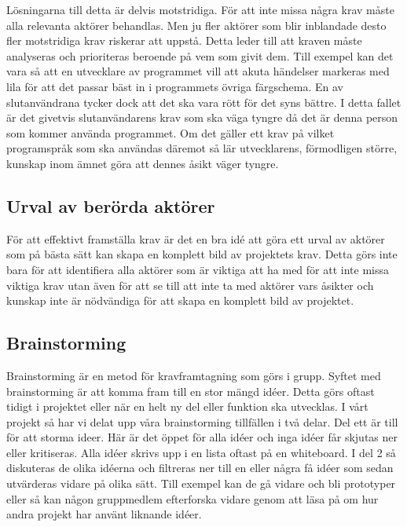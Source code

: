 Lösningarna till detta är delvis motstridiga. För att inte missa några krav måste alla relevanta aktörer behandlas. Men ju fler aktörer som blir inblandade desto fler motstridiga krav riskerar att uppstå. Detta leder till att kraven måste analyseras och prioriteras beroende på vem som givit dem.
Till exempel kan det vara så att en utvecklare av programmet vill att akuta händelser markeras med lila för att det passar bäst in i programmets övriga färgschema. En av slutanvändrana tycker dock att det ska vara rött för det syns bättre. I detta fallet är det givetvis slutanvändarens krav som ska väga tyngre då det är denna person som kommer använda programmet. 
Om det gäller ett krav på vilket programspråk som ska användas däremot så lär utvecklarens, förmodligen större, kunskap inom ämnet göra att dennes åsikt väger tyngre.

\subsection{Urval av berörda aktörer}
För att effektivt framställa krav är det en bra idé att göra ett urval av aktörer som på bästa sätt kan skapa en komplett bild av projektets krav. Detta görs inte bara för att identifiera alla aktörer som är viktiga att ha med för att inte missa viktiga krav utan även för att se till att inte ta med aktörer vars åsikter och kunskap inte är nödvändiga för att skapa en komplett bild av projektet.

\subsection{Brainstorming}
Brainstorming är en metod för kravframtagning som görs i grupp. Syftet med brainstorming är att komma fram till en stor mängd idéer. Detta görs oftast tidigt i projektet eller när en helt ny del eller funktion ska utvecklas. I vårt projekt så har vi delat upp våra brainstorming tillfällen i två delar. Del ett är till för att storma ideer. Här är det öppet för alla idéer och inga idéer får skjutas ner eller kritiseras. Alla idéer skrivs upp i en lista oftast på en whiteboard. I del 2 så diskuteras de olika idéerna och filtreras ner till en eller några få idéer som sedan utvärderas vidare på olika sätt. Till exempel kan de gå vidare och bli prototyper eller så kan någon gruppmedlem efterforska vidare genom att läsa på om hur andra projekt har använt liknande idéer. 

